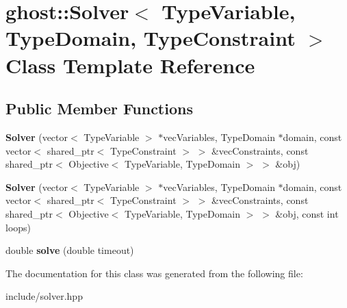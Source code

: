 \hypertarget{classghost_1_1Solver}{\section{ghost\-:\-:Solver$<$ Type\-Variable, Type\-Domain, Type\-Constraint $>$ Class Template Reference}
\label{classghost_1_1Solver}
}
\subsection*{Public Member Functions}
\begin{DoxyCompactItemize}
\item 
\hypertarget{classghost_1_1Solver_a2b600f86be53c864a02c9ae56ebb9104}{{\bfseries Solver} (vector$<$ Type\-Variable $>$ $\ast$vec\-Variables, Type\-Domain $\ast$domain, const vector$<$ shared\-\_\-ptr$<$ Type\-Constraint $>$ $>$ \&vec\-Constraints, const shared\-\_\-ptr$<$ Objective$<$ Type\-Variable, Type\-Domain $>$ $>$ \&obj)}\label{classghost_1_1Solver_a2b600f86be53c864a02c9ae56ebb9104}

\item 
\hypertarget{classghost_1_1Solver_a512335329b22a91700bdfa7870f053e9}{{\bfseries Solver} (vector$<$ Type\-Variable $>$ $\ast$vec\-Variables, Type\-Domain $\ast$domain, const vector$<$ shared\-\_\-ptr$<$ Type\-Constraint $>$ $>$ \&vec\-Constraints, const shared\-\_\-ptr$<$ Objective$<$ Type\-Variable, Type\-Domain $>$ $>$ \&obj, const int loops)}\label{classghost_1_1Solver_a512335329b22a91700bdfa7870f053e9}

\item 
\hypertarget{classghost_1_1Solver_a30dd2769fb30ac42d231d2c305dcdf13}{double {\bfseries solve} (double timeout)}\label{classghost_1_1Solver_a30dd2769fb30ac42d231d2c305dcdf13}

\end{DoxyCompactItemize}


The documentation for this class was generated from the following file\-:\begin{DoxyCompactItemize}
\item 
include/solver.\-hpp\end{DoxyCompactItemize}
